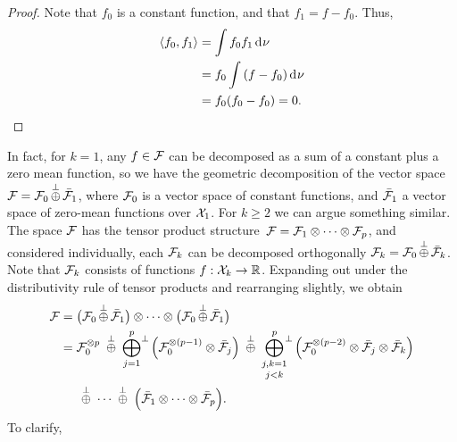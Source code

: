 \documentclass[a4paper,showframe,11pt,draft]{report}
\begin{document}
\begin{proof}
  Note that $f_0$ is a constant function, and that $f_1 = f- f_0$.
  Thus,
  \begin{align*}
    \langle f_0,f_1\rangle 
    &= \int f_0f_1 \operatorname{d\!\:\!}\nu \\
    &= f_0 \int \left(f - f_0\right) \operatorname{d\!\:\!}\nu \\
    &= f_0 (f_0 - f_0) = 0.
  \end{align*}
\end{proof}

In fact, for $k=1$, any $f \in {\mathcal F}$ can be decomposed as a sum of a constant plus a zero mean function, so we have the geometric decomposition of the vector space ${\mathcal F} = {\mathcal F}_0 \displaystyle\mathop{\oplus}^\bot \bar{{\mathcal F}}_1$, where ${\mathcal F}_0$ is a vector space of constant functions, and $\bar{{\mathcal F}}_1$ a vector space of zero-mean functions over ${\mathcal X}_1$.
For $k\geq 2$ we can argue something similar.
The space ${\mathcal F}$ has the tensor product structure\footnotemark~${\mathcal F} = {\mathcal F}_1 \otimes \cdots \otimes {\mathcal F}_p$, and considered individually, each ${\mathcal F}_k$ can be decomposed orthogonally ${\mathcal F}_k = {\mathcal F}_{0} \displaystyle\mathop{\oplus}^\bot \bar{{\mathcal F}}_k$.
Note that ${\mathcal F}_k$ consists of functions $f:{\mathcal X}_k\to\mathbb{R}$.
Expanding out under the distributivity rule of tensor products and rearranging slightly, we obtain
\begin{align}
  \cF &= \big( \cF_0 \mathop{\oplus}^\bot \bar\cF_1 \big) \otimes \cdots \otimes 
  \big( \cF_0 \mathop{\oplus}^\bot \bar\cF_1 \big) \nonumber \\
  &= \cF_{0}^{\otimes p} 
  \ \mathop{\oplus}^\bot \
  \bigoplus_{j=1}^p \! \mathop{\vphantom\oplus}^\bot \Big( \cF_0^{\otimes (p-1)} \otimes \bar\cF_j \Big) 
  \ \mathop{\oplus}^\bot \
  \mathop{\bigoplus_{j,k=1}^p}_{j<k} \!\! \mathop{\vphantom\oplus}^\bot  \Big( \cF_0^{\otimes (p-2)} \otimes \bar\cF_j \otimes \bar\cF_k \Big)
  \label{eq:funcanovaspace} \\
  &\phantom{==} \mathop{\oplus}^\bot \ 
  \cdots 
  \ \mathop{\oplus}^\bot \ 
  \Big( \bar\cF_1 \otimes \cdots \otimes \bar\cF_p \Big). \nonumber
\end{align}
To clarify,
\end{document}
